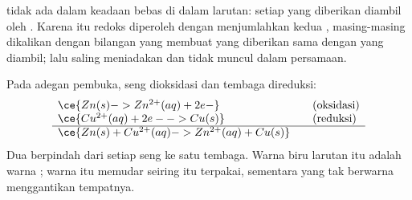 \begin{proposition}\label{prop:g11:redox:no-free-electrons}
 tidak ada dalam keadaan bebas di dalam larutan: setiap 
yang diberikan  diambil oleh . Karena itu  redoks diperoleh dengan menjumlahkan kedua ,
masing-masing dikalikan dengan bilangan yang membuat  yang
diberikan sama dengan  yang diambil;  lalu
saling meniadakan dan tidak muncul dalam persamaan.
\end{proposition}

\begin{example}\label{ex:g11:redox:zinc-copper}
Pada adegan pembuka, seng dioksidasi dan  tembaga direduksi:
\[
\begin{array}{l@{\qquad}l}
  \ce{Zn(s) -> Zn^{2+}(aq) + 2e-} & \text{(oksidasi)}\\
  \ce{Cu^{2+}(aq) + 2e- -> Cu(s)} & \text{(reduksi)}\\
  \hline
  \ce{Zn(s) + Cu^{2+}(aq) -> Zn^{2+}(aq) + Cu(s)} &
\end{array}
\]
Dua  berpindah dari setiap  seng ke satu  tembaga. Warna
biru larutan itu adalah warna  ; warna itu memudar
seiring  itu terpakai, sementara   yang tak
berwarna menggantikan tempatnya.
\end{example}

